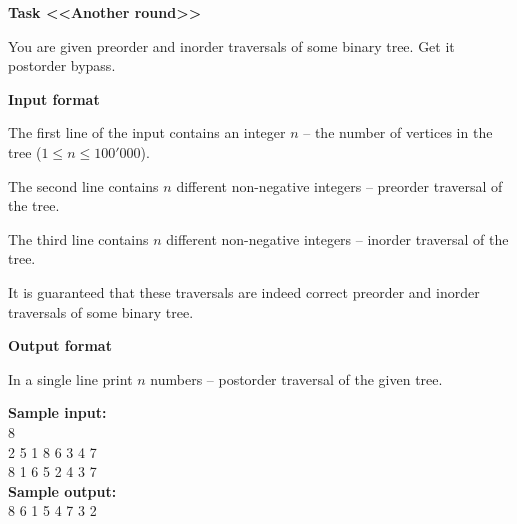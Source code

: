 \documentclass[a4paper]{article}
\begin{document}
\textbf{Task <<Another round>>}

You are given preorder and inorder traversals of some binary tree. Get it postorder bypass.

\SPACE

\textbf{Input format}

The first line of the input contains an integer $n$ -- the number of vertices in the tree ($1 \le n \le 100'000$).

The second line contains $n$ different non-negative integers -- preorder traversal of the tree.

The third line contains $n$ different non-negative integers -- inorder traversal of the tree.

It is guaranteed that these traversals are indeed correct preorder and inorder traversals of some binary tree.

\SPACE

\textbf{Output format}

In a single line print $n$ numbers -- postorder traversal of the given tree.

\LINE

\noindent \textbf{Sample input:}\\
8\\
2 5 1 8 6 3 4 7\\
8 1 6 5 2 4 3 7\\

\noindent \textbf{Sample output:}\\
8 6 1 5 4 7 3 2\\
\end{document}
